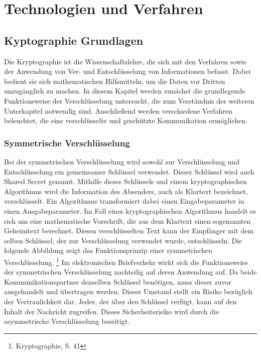 \documentclass  [paper=a4,
				fontsize=12pt,
				listof=totoc,
				bibliography=totoc
				]{scrreprt}
\begin{document}
	\chapter{Technologien und Verfahren}
		\section{Kyptographie Grundlagen}
				Die Kryptographie ist die Wissenschaftslehre, die sich mit den Verfahren sowie der Anwendung von Ver- und Entschlüsselung von Informationen befasst. Dabei bedient sie sich mathematischen Hilfsmitteln, um die Daten vor Dritten unzugänglich zu machen. In diesem Kapitel werden zunächst die grundlegende Funktionsweise der Verschlüsselung untersucht, die zum Verständnis der weiteren Unterkapitel notwendig sind. Anschließend werden verschiedene Verfahren beleuchtet, die eine verschlüsselte und geschützte Kommunikation ermöglichen.
			\subsection{Symmetrische Verschlüsselung}
				Bei der symmetrischen Verschlüsselung wird sowohl zur Verschlüsselung und Entschlüsselung ein gemeinsamer Schlüssel verwendet. Dieser Schlüssel wird auch Shared Secret genannt. Mithilfe dieses Schlüssels und einem kryptographischen Algorithmus wird die Information des Absenders, auch als Klartext bezeichnet, verschlüsselt. Ein Algorithmus transformiert dabei einen Eingabeparameter in einen Ausgabeparameter. Im Fall eines kryptographischen Algorithmus handelt es sich um eine mathematische Vorschrift, die aus dem Klartext einen sogenannten Geheimtext berechnet. Diesen verschlüsselten Text kann der Empfänger mit dem selben Schlüssel, der zur Verschlüsselung verwendet wurde, entschlüsseln. Die folgende Abbildung zeigt das Funktionsprinzip einer symmetrischen Verschlüsselung.
				\footnote{Kryptographie, S. 41}
				Im elektronischen Briefverkehr wirkt sich die Funktionsweise der symmetrischen Verschlüsselung nachteilig auf deren Anwendung auf. Da beide Kommunikationspartner denselben Schlüssel benötigen, muss dieser zuvor ausgehandelt und übertragen werden. Dieser Umstand stellt ein Risiko bezüglich der Vertraulichkeit dar. Jeder, der über den Schlüssel verfügt, kann auf den Inhalt der Nachricht zugreifen. Dieses Sicherheitsrisiko wird durch die asymmetrische Verschlüsselung beseitigt.
\end{document}
